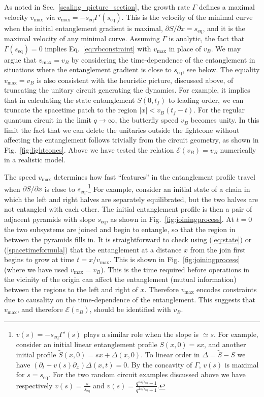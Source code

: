 \documentclass[aps,prx,twocolumn,superscriptaddress,floatfix,nofootinbib,prx]{revtex4}
\newcommand{\f}{\frac}
\renewcommand{\>}{\right\rangle}
\newcommand{\<}{\left\langle}
\newcommand{\seq}{s_\text{eq}}
\newcommand{\lt}{\mathcal{E}}
\begin{document}
As noted in Sec.~\ref{scaling_picture_section}, the growth rate $\Gamma$ defines a maximal velocity $v_\text{max}$ via ${v_\text{max} = - \seq \Gamma'(\seq)}$. This is the velocity of the minimal curve when the initial entanglement gradient is maximal, $\partial S/\partial x = \seq$, and it is the maximal velocity of any minimal curve. Assuming $\Gamma$ is analytic, the fact that $\Gamma(\seq)=0$ implies Eq.~\ref{eq:vbconstraint} with $v_\text{max}$ in place of $v_B$.  We may argue that $v_\text{max} = v_B$ by considering the time-dependence of the entanglement in situations where the entanglement gradient is close to $\seq$, see below. The equality $v_\text{max} = v_B$ is also consistent with the heuristic picture, discussed above, of truncating the unitary circuit generating the dynamics. For example, it implies that in calculating the state entanglement $S(0, t_f)$ to leading order, we can truncate the spacetime patch to the region ${|x|<v_B(t_f-t)}$. For the regular quantum circuit in the limit $q\rightarrow \infty$, the butterfly speed $v_B$ becomes unity. In this limit the fact that we can delete the unitaries outside the lightcone without affecting the entanglement follows trivially from the circuit geometry, as shown in Fig.~\ref{fig:lightcones}. Above we have tested the relation $\lt(v_B)=v_B$ numerically in a realistic model.

The speed $v_\text{max}$ determines how fast ``features'' in the entanglement profile travel when $\partial S/\partial x$ is close to $\seq$.\footnote{$v(s) = - \seq \Gamma'(s)$ plays a similar role when the slope is  $\simeq s$.
For example, consider an initial linear entanglement profile ${S(x,0)= s x}$, and another initial profile ${\widetilde S(x,0) = s x+ \Delta(x,0)}$. To linear order in $\Delta=\tilde S-S$ we have $(\partial_t + v(s) \partial_x) \Delta (x,t)=0$. By the concavity of $\Gamma$, $v(s)$ is maximal for $s=\seq$. For the two random circuit examples discussed above we have respectively
$v(s)= \f{s}{\seq}$ and $v(s)= \f{q^{2 s/\seq}-1}{q^{2 s/\seq}+1}$.}  
For example,  consider an initial state of a chain in which the left and right halves are separately equilibrated, but the two halves are not entangled with each other. The initial entanglement profile is then a pair of adjacent pyramids with slope $\seq$, as shown in Fig.~\ref{fig:joiningprocess}. At $t=0$ the two subsystems are joined and begin to entangle, so that the region in between the pyramids fills in. It is straightforward to check using (\ref{eq:state}) or (\ref{spacetimeformula}) that the entanglement at a distance $x$ from the join first begins to grow at time $t = x/v_\text{max}$.
This is shown in Fig.~\ref{fig:joiningprocess} (where we have used $v_\text{max}=v_B$). This is the time required before operations in the vicinity of the origin can affect the entanglement (mutual information) between the regions to the left and right of $x$. Therefore $v_\text{max}$ encodes constraints due to causality on the time-dependence of the entanglement. This suggests that $v_\text{max}$, and therefore $\lt(v_B)$, should be identified with $v_B$. 
\end{document}
